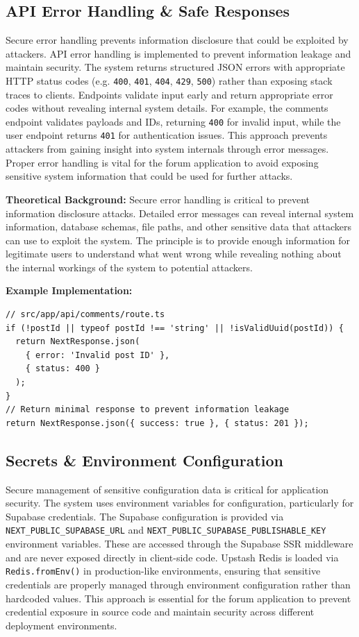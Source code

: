 \subsection{API Error Handling \& Safe Responses}

Secure error handling prevents information disclosure that could be exploited by attackers. API error handling is implemented to prevent information leakage and maintain security. The system returns structured JSON errors with appropriate HTTP status codes (e.g. \texttt{400}, \texttt{401}, \texttt{404}, \texttt{429}, \texttt{500}) rather than exposing stack traces to clients. Endpoints validate input early and return appropriate error codes without revealing internal system details. For example, the comments endpoint validates payloads and IDs, returning \texttt{400} for invalid input, while the user endpoint returns \texttt{401} for authentication issues. This approach prevents attackers from gaining insight into system internals through error messages. Proper error handling is vital for the forum application to avoid exposing sensitive system information that could be used for further attacks.

\textbf{Theoretical Background:} Secure error handling is critical to prevent information disclosure attacks. Detailed error messages can reveal internal system information, database schemas, file paths, and other sensitive data that attackers can use to exploit the system. The principle is to provide enough information for legitimate users to understand what went wrong while revealing nothing about the internal workings of the system to potential attackers.

\textbf{Example Implementation:}
\begin{verbatim}
// src/app/api/comments/route.ts
if (!postId || typeof postId !== 'string' || !isValidUuid(postId)) {
  return NextResponse.json(
    { error: 'Invalid post ID' },
    { status: 400 }
  );
}
// Return minimal response to prevent information leakage
return NextResponse.json({ success: true }, { status: 201 });
\end{verbatim}

\subsection{Secrets \& Environment Configuration}

Secure management of sensitive configuration data is critical for application security. The system uses environment variables for configuration, particularly for Supabase credentials. The Supabase configuration is provided via \texttt{NEXT\_PUBLIC\_SUPABASE\_URL} and \texttt{NEXT\_PUBLIC\_SUPABASE\_PUBLISHABLE\_KEY} environment variables. These are accessed through the Supabase SSR middleware and are never exposed directly in client-side code. Upstash Redis is loaded via \texttt{Redis.fromEnv()} in production-like environments, ensuring that sensitive credentials are properly managed through environment configuration rather than hardcoded values. This approach is essential for the forum application to prevent credential exposure in source code and maintain security across different deployment environments.

